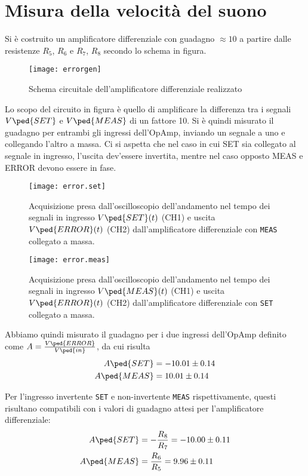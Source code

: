 \documentclass[10pt, a4paper, italian]{article}
\begin{document}
\section{Misura della velocità del suono}
Si è costruito un amplificatore differenziale con guadagno $\approx 10$ a
partire dalle resistenze $R_5$, $R_6$ e $R_7$, $R_8$ secondo lo schema in
figura.
\begin{figure}[htbp]
    \centering
	\texttt{[image: errorgen]}
    \caption{Schema circuitale dell'amplificatore differenziale realizzato
    \label{schm: errgen}}
\end{figure}
Lo scopo del circuito in figura è quello di amplificare la differenza tra i
segnali $V\ped{SET}$ e $V\ped{MEAS}$ di un fattore 10.
Si è quindi misurato il guadagno per entrambi gli ingressi dell'OpAmp,
inviando un segnale a uno e collegando l'altro a massa. Ci si aspetta che nel
caso in cui SET sia collegato al segnale in ingresso, l'uscita dev'essere
invertita, mentre nel caso opposto MEAS e ERROR devono essere in fase.
\begin{figure}[htbp]
    \centering
	\texttt{[image: error.set]}
    \caption{Acquisizione presa dall'oscilloscopio dell'andamento nel tempo dei
	segnali in ingresso $V\ped{SET} (t)$ (CH1) e uscita $V\ped{ERROR} (t)$ (CH2)
	dall'amplificatore differenziale con \texttt{MEAS} collegato a massa.
    \label{fig: errset}}
\end{figure}
\begin{figure}[htbp]
    \centering
	\texttt{[image: error.meas]}
    \caption{Acquisizione presa dall'oscilloscopio dell'andamento nel tempo dei
	segnali in ingresso $V\ped{MEAS} (t)$ (CH1) e uscita $V\ped{ERROR} (t)$ (CH2)
	dall'amplificatore differenziale con \texttt{SET} collegato a massa.
    \label{fig: errmeas}}
\end{figure}

Abbiamo quindi misurato il guadagno per i due ingressi dell'OpAmp definito
come $A = \frac{V\ped{ERROR}}{V\ped{in}}$, da cui risulta
\begin{align*}
A\ped{SET} &= -10.01 \pm 0.14 \\
A\ped{MEAS} &= 10.01 \pm 0.14
\end{align*}

Per l'ingresso invertente \verb+SET+ e non-invertente \verb+MEAS+
rispettivamente, questi risultano compatibili con i valori di guadagno attesi
per l'amplificatore differenziale:
\begin{align*}
A\ped{SET} &= - \frac{R_8}{R_7} = -10.00 \pm 0.11 \\
A\ped{MEAS} &= \frac{R_6}{R_5} = 9.96 \pm 0.11
\end{align*}
\end{document}
